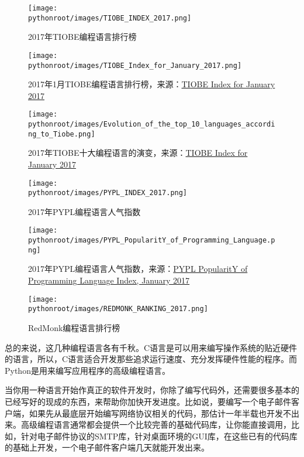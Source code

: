 \begin{figure}[ht]
  \centering
  \texttt{[image: \\pythonroot/images/TIOBE\_INDEX\_2017.png]}
  \caption{2017年TIOBE编程语言排行榜}
  \label{fig:TIOBE_INDEX_2017}
\end{figure}

\begin{figure}[ht]
  \centering
  \texttt{[image: \\pythonroot/images/TIOBE\_Index\_for\_January\_2017.png]}
  \caption{2017年1月TIOBE编程语言排行榜，来源：\href{http://www.tiobe.com/tiobe-index//}{TIOBE Index for January 2017}}
  \label{fig:TIOBE_Index_for_January_2017}
\end{figure}

\begin{figure}[ht]
  \centering
  \texttt{[image: \\pythonroot/images/Evolution\_of\_the\_top\_10\_languages\_according\_to\_Tiobe.png]}
  \caption{2017年TIOBE十大编程语言的演变，来源：\href{http://www.tiobe.com/tiobe-index//}{TIOBE Index for January 2017}}
  \label{fig:TIOBE_Top10_LANGUAGE_EVOLUTION}
\end{figure}

\begin{figure}[ht]
  \centering
  \texttt{[image: \\pythonroot/images/PYPL\_INDEX\_2017.png]}
  \caption{2017年PYPL编程语言人气指数}
  \label{fig:PYPL_INDEX_2017}
\end{figure}

\begin{figure}[ht]
  \centering
  \texttt{[image: \\pythonroot/images/PYPL\_PopularitY\_of\_Programming\_Language.png]}
  \caption{2017年PYPL编程语言人气指数，来源：\href{http://pypl.github.io/PYPL.html}{PYPL PopularitY of Programming Language Index, January 2017}}
  \label{fig:PYPL_PopularitY_of_Programming_Language}
\end{figure}


\begin{figure}[ht]
  \centering
  \texttt{[image: \\pythonroot/images/REDMONK\_RANKING\_2017.png]}
  \caption{RedMonk编程语言排行榜}
  \label{fig:REDMONK_RANKING_2017}
\end{figure}

总的来说，这几种编程语言各有千秋。C语言是可以用来编写操作系统的贴近硬件的语言，所以，C语言适合开发那些追求运行速度、充分发挥硬件性能的程序。而Python是用来编写应用程序的高级编程语言。

当你用一种语言开始作真正的软件开发时，你除了编写代码外，还需要很多基本的已经写好的现成的东西，来帮助你加快开发进度。比如说，要编写一个电子邮件客户端，如果先从最底层开始编写网络协议相关的代码，那估计一年半载也开发不出来。高级编程语言通常都会提供一个比较完善的基础代码库，让你能直接调用，比如，针对电子邮件协议的SMTP库，针对桌面环境的GUI库，在这些已有的代码库的基础上开发，一个电子邮件客户端几天就能开发出来。

